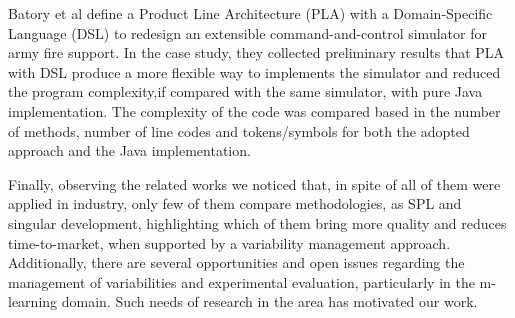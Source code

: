 Batory et al \cite{batory02} define a Product Line Architecture (PLA) with a Domain-Specific Language (DSL) to redesign an extensible command-and-control simulator for army fire support. In the case study, they collected preliminary results that PLA with DSL produce a more flexible way to implements the simulator and reduced the program complexity,if compared with the same simulator, with pure Java implementation. The complexity of the code was compared based in the number of methods, number of line codes and tokens/symbols for both the adopted approach and the Java implementation.

Finally, observing the related works we noticed that, in spite of all of them were applied in industry, only few of them compare methodologies, as SPL and singular development, highlighting which of them bring more quality and reduces time-to-market, when supported by a variability management approach. Additionally, there are several opportunities and open issues regarding the management of variabilities and experimental evaluation, particularly in the m-learning domain. Such needs of research in the area has motivated our work.